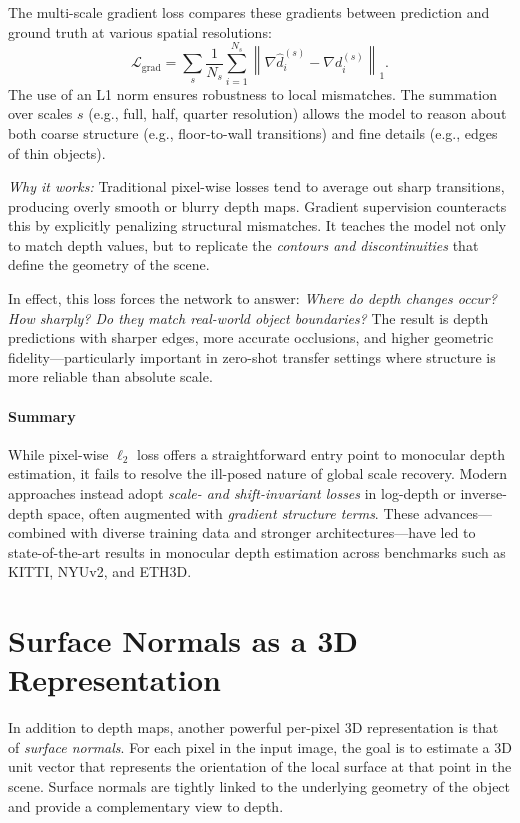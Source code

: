 The multi-scale gradient loss compares these gradients between prediction and ground truth at various spatial resolutions:
\[
\mathcal{L}_{\text{grad}} = \sum_{s} \frac{1}{N_s} \sum_{i=1}^{N_s} \left\| \nabla \hat{d}_i^{(s)} - \nabla d_i^{(s)} \right\|_1.
\]
The use of an L1 norm ensures robustness to local mismatches. The summation over scales \( s \) (e.g., full, half, quarter resolution) allows the model to reason about both coarse structure (e.g., floor-to-wall transitions) and fine details (e.g., edges of thin objects).

\medskip
\textit{Why it works:} Traditional pixel-wise losses tend to average out sharp transitions, producing overly smooth or blurry depth maps. Gradient supervision counteracts this by explicitly penalizing structural mismatches. It teaches the model not only to match depth values, but to replicate the \emph{contours and discontinuities} that define the geometry of the scene.

In effect, this loss forces the network to answer: \emph{Where do depth changes occur? How sharply? Do they match real-world object boundaries?} The result is depth predictions with sharper edges, more accurate occlusions, and higher geometric fidelity—particularly important in zero-shot transfer settings where structure is more reliable than absolute scale.

\paragraph{Summary}

While pixel-wise $\ell_2$ loss offers a straightforward entry point to monocular depth estimation, it fails to resolve the ill-posed nature of global scale recovery. Modern approaches instead adopt \emph{scale- and shift-invariant losses} in log-depth or inverse-depth space, often augmented with \emph{gradient structure terms}. These advances—combined with diverse training data and stronger architectures—have led to state-of-the-art results in monocular depth estimation across benchmarks such as KITTI, NYUv2, and ETH3D.

\section{Surface Normals as a 3D Representation}
\label{sec:chapter23_surface_normals}

In addition to depth maps, another powerful per-pixel 3D representation is that of \emph{surface normals}. For each pixel in the input image, the goal is to estimate a 3D unit vector that represents the orientation of the local surface at that point in the scene. Surface normals are tightly linked to the underlying geometry of the object and provide a complementary view to depth.

